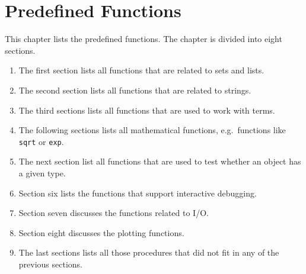\chapter{Predefined Functions}
This chapter lists  the predefined functions.  The chapter is divided into eight
sections.
\begin{enumerate}
\item The first section lists all functions that are related to sets and lists.
\item The second section lists all functions that are related to strings.
\item The third sections lists all functions that are used to work with terms.
\item The following sections lists all mathematical functions, e.g.~functions 
      like \texttt{sqrt} or \texttt{exp}.
\item The next section list all functions that are used to test whether an object has a
      given type.
\item Section six lists the functions that support interactive debugging.
\item Section seven discusses the functions related to I/O.
\item Section eight discusses the plotting functions.
\item The last sections lists all those procedures that did not fit in 
      any of the previous sections.  
\end{enumerate}

